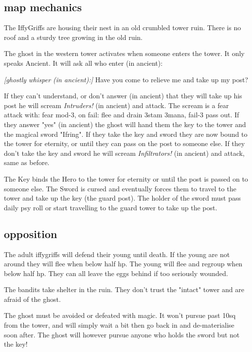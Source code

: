 \subsection*{map mechanics}

The IffyGriffs are housing their nest in an old crumbled tower ruin. There is no roof and a sturdy tree growing in the old ruin.

The ghost in the western tower activates when someone enters the tower. It only speaks Ancient. It will ask all who enter (in ancient):
\begin{readoutloud}
\emph{[ghostly whisper (in ancient):]}
Have you come to relieve me and take up my post?
\end{readoutloud}
\noindent If they can't understand, or don't answer (in ancient) that they will take up his post he will scream \emph{Intruders!} (in ancient) and attack. The scream is a fear attack with: fear mod-3, on fail: flee and drain 3stam 3mana, fail-3 pass out.
If they answer "yes" (in ancient) the ghost will hand them the key to the tower and the magical sword "Ifring". If they take the key and sword they are now bound to the tower for eternity, or until they can pass on the post to someone else. If they don't take the key and sword he will scream \emph{Infiltrators!} (in ancient) and attack, same as before.

The Key binds the Hero to the tower for eternity or until the post is passed on to someone else. The Sword is cursed and eventually forces them to travel to the tower and take up the key (the guard post). The holder of the sword must pass daily psy roll or start travelling to the guard tower to take up the post.


\subsection*{opposition}

The adult iffygriffs will defend their young until death. If the young are not around they will flee when below half hp. The young will flee and regroup when below half hp. They can all leave the eggs behind if too seriously wounded.

The bandits take shelter in the ruin. They don't trust the "intact" tower and are afraid of the ghost.

The ghost must be avoided or defeated with magic. It won't pursue past 10sq from the tower, and will simply wait a bit then go back in and de-materialise soon after. The ghost will however pursue anyone who holds the sword but not the key!


